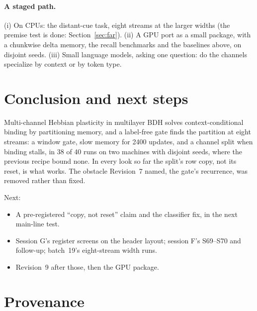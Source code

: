 \documentclass[11pt]{article}
\begin{document}
\paragraph{A staged path.} (i) On CPUs: the distant-cue task, eight streams at the larger widths (the premise test is done: Section~\ref{sec:far}). (ii) A GPU port as a small package, with a chunkwise delta memory, the recall benchmarks \cite{zoology} and the baselines above, on disjoint seeds. (iii) Small language models, asking one question: do the channels specialize by context or by token type.

\section{Conclusion and next steps}

Multi-channel Hebbian plasticity in multilayer BDH solves context-conditional binding by partitioning memory, and a label-free gate finds the partition at eight streams: a window gate, slow memory for 2400 updates, and a channel split when binding stalls, in 38 of 40 runs on two machines with disjoint seeds, where the previous recipe bound none. In every look so far the split's row copy, not its reset, is what works. The obstacle Revision~7 named, the gate's recurrence, was removed rather than fixed.

Next:
\begin{itemize}
\item A pre-registered ``copy, not reset'' claim and the classifier fix, in the next main-line test.
\item Session G's register screens on the header layout; session F's S69--S70 and follow-up; batch~19's eight-stream width runs.
\item Revision~9 after those, then the GPU package.
\end{itemize}

\appendix
\section{Provenance}
\label{app:prov}
\end{document}
